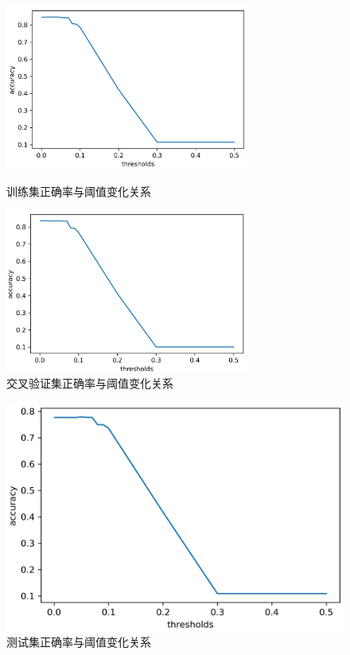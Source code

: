 \documentclass{article}
\begin{document}
\begin{figure}[htbp]
  \centering
  \begin{minipage}[t]{0.48\textwidth}
    \centering
    \includegraphics[width=8cm]{train.png}
    \caption{训练集正确率与阈值变化关系}
    \label{fig:train}
  \end{minipage}
  \begin{minipage}[t]{0.48\textwidth}
    \centering
    \includegraphics[width=8cm]{cross_validation.png}
    \caption{交叉验证集正确率与阈值变化关系}
    \label{fig:cross_validation}
  \end{minipage}
\end{figure}

\begin{figure}
  \centering
  \includegraphics[width=12cm]{test.png}
  \caption{测试集正确率与阈值变化关系}
  \label{fig:test}
\end{figure}




\end{document}
